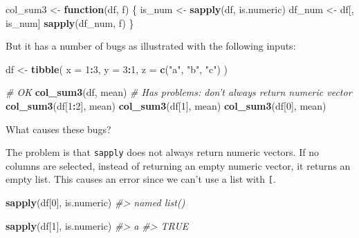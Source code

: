 \documentclass[]{book}
\newenvironment{Shaded}{\begin{snugshade}}{\end{snugshade}}
\newcommand{\CommentTok}[1]{\textcolor[rgb]{0.56,0.35,0.01}{\textit{#1}}}
\newcommand{\ControlFlowTok}[1]{\textcolor[rgb]{0.13,0.29,0.53}{\textbf{#1}}}
\newcommand{\DataTypeTok}[1]{\textcolor[rgb]{0.13,0.29,0.53}{#1}}
\newcommand{\DecValTok}[1]{\textcolor[rgb]{0.00,0.00,0.81}{#1}}
\newcommand{\KeywordTok}[1]{\textcolor[rgb]{0.13,0.29,0.53}{\textbf{#1}}}
\newcommand{\NormalTok}[1]{#1}
\newcommand{\OperatorTok}[1]{\textcolor[rgb]{0.81,0.36,0.00}{\textbf{#1}}}
\newcommand{\StringTok}[1]{\textcolor[rgb]{0.31,0.60,0.02}{#1}}
\theoremstyle{plain}
\theoremstyle{remark}
\begin{document}
\begin{Shaded}
\begin{Highlighting}[]
\NormalTok{col_sum3 <-}\StringTok{ }\ControlFlowTok{function}\NormalTok{(df, f) \{}
\NormalTok{  is_num <-}\StringTok{ }\KeywordTok{sapply}\NormalTok{(df, is.numeric)}
\NormalTok{  df_num <-}\StringTok{ }\NormalTok{df[, is_num]}
  \KeywordTok{sapply}\NormalTok{(df_num, f)}
\NormalTok{\}}
\end{Highlighting}
\end{Shaded}

But it has a number of bugs as illustrated with the following inputs:

\begin{Shaded}
\begin{Highlighting}[]
\NormalTok{df <-}\StringTok{ }\KeywordTok{tibble}\NormalTok{(}
  \DataTypeTok{x =} \DecValTok{1}\OperatorTok{:}\DecValTok{3}\NormalTok{,}
  \DataTypeTok{y =} \DecValTok{3}\OperatorTok{:}\DecValTok{1}\NormalTok{,}
  \DataTypeTok{z =} \KeywordTok{c}\NormalTok{(}\StringTok{"a"}\NormalTok{, }\StringTok{"b"}\NormalTok{, }\StringTok{"c"}\NormalTok{)}
\NormalTok{)}

\CommentTok{# OK}
\KeywordTok{col_sum3}\NormalTok{(df, mean)}
\CommentTok{# Has problems: don't always return numeric vector}
\KeywordTok{col_sum3}\NormalTok{(df[}\DecValTok{1}\OperatorTok{:}\DecValTok{2}\NormalTok{], mean)}
\KeywordTok{col_sum3}\NormalTok{(df[}\DecValTok{1}\NormalTok{], mean)}
\KeywordTok{col_sum3}\NormalTok{(df[}\DecValTok{0}\NormalTok{], mean)}
\end{Highlighting}
\end{Shaded}

What causes these bugs?

The problem is that \texttt{sapply} does not always return numeric
vectors. If no columns are selected, instead of returning an empty
numeric vector, it returns an empty list. This causes an error since we
can't use a list with \texttt{{[}}.

\begin{Shaded}
\begin{Highlighting}[]
\KeywordTok{sapply}\NormalTok{(df[}\DecValTok{0}\NormalTok{], is.numeric)}
\CommentTok{#> named list()}
\end{Highlighting}
\end{Shaded}

\begin{Shaded}
\begin{Highlighting}[]
\KeywordTok{sapply}\NormalTok{(df[}\DecValTok{1}\NormalTok{], is.numeric)}
\CommentTok{#>    a }
\CommentTok{#> TRUE}
\end{Highlighting}
\end{Shaded}
\end{document}
